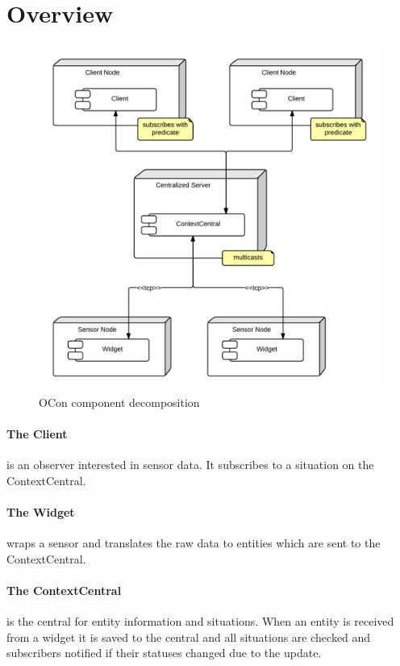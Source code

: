 \documentclass[../report.tex]{subfiles}
\begin{document}
\graphicspath{{img/}{../img/}}
\section{Overview}


\begin{figure}
\centering
\includegraphics[width=\linewidth]{ComponentDiagram.png}
\caption{OCon component decomposition}
\label{fig:componentdiagram}
\end{figure}


\paragraph{The Client} is an observer interested in sensor data. It subscribes to a situation on the ContextCentral.

\paragraph{The Widget} wraps a sensor and translates the raw data to entities which are sent to the ContextCentral.

\paragraph{The ContextCentral} is the central for entity information and situations. When an entity is received from a widget it is saved to the central and all situations are checked and subscribers notified if their statuses changed due to the update.
\end{document}
